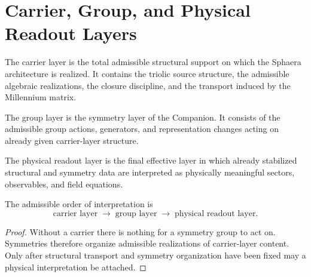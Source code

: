\section{Carrier, Group, and Physical Readout Layers}
\label{sec:carrier-group-readout}

\begin{definition}
The carrier layer is the total admissible structural support on which the
Sphaera architecture is realized. It contains the triolic source structure,
the admissible algebraic realizations, the closure discipline, and the
transport induced by the Millennium matrix.
\end{definition}

\begin{definition}
The group layer is the symmetry layer of the Companion. It consists of the
admissible group actions, generators, and representation changes acting on
already given carrier-layer structure.
\end{definition}

\begin{definition}
The physical readout layer is the final effective layer in which already
stabilized structural and symmetry data are interpreted as physically
meaningful sectors, observables, and field equations.
\end{definition}

\begin{theorem}
\label{thm:carrier-group-readout-order}
The admissible order of interpretation is
\[
\text{carrier layer}
\;\longrightarrow\;
\text{group layer}
\;\longrightarrow\;
\text{physical readout layer}.
\]
\end{theorem}

\begin{proof}
Without a carrier there is nothing for a symmetry group to act on. Symmetries
therefore organize admissible realizations of carrier-layer content. Only
after structural transport and symmetry organization have been fixed may a
physical interpretation be attached.
\end{proof}

